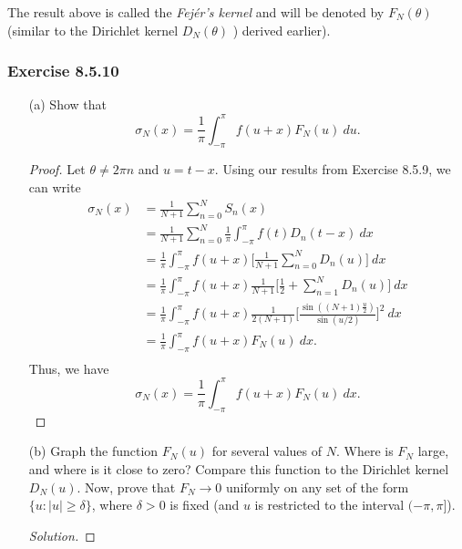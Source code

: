 The result above is called the \textit{Fej\'{e}r's kernel} and will be denoted by \( F_{N}(\theta)  \) (similar to the Dirichlet kernel \( D_{N}(\theta)  \) ) derived earlier).
\subsubsection{Exercise 8.5.10} 
\begin{enumerate}
    \item[(a)] Show that 
        \[  \sigma_{N}(x) = \frac{ 1 }{ \pi  } \int_{ -\pi  }^{ \pi  } f(u+x) F_{N}(u)   \ du. \]
        \begin{proof}
        Let \( \theta \neq 2 \pi n \) and \( u = t - x   \). Using our results from Exercise 8.5.9, we can write 
        \begin{align*}
          \sigma_{N}(x)   &= \frac{ 1 }{ N+1 } \sum_{ n=0 }^{ N } S_{n}(x) \\
                    &= \frac{ 1 }{ N+1 } \sum_{ n=0  }^{ N } \frac{ 1 }{ \pi  } \int_{ -\pi  }^{ \pi  } f(t) D_{n}(t-x) \ dx \\ 
                    &= \frac{ 1 }{ \pi  } \int_{ -\pi  }^{ \pi  } f(u+x) \Big[  \frac{ 1  }{ N+1 } \sum_{ n=0  }^{ N  } D_{n}(u) \Big]  \ dx \\
                    &= \frac{ 1 }{ \pi  } \int_{ -\pi  }^{ \pi  } f(u+x) \frac{ 1 }{ N+1 } \Big[ \frac{ 1 }{ 2 } + \sum_{ n=1 }^{ N } D_{n}(u) \Big]   \ dx \\
                    &= \frac{ 1 }{ \pi  } \int_{ -\pi  }^{ \pi  } f(u+x) \frac{ 1 }{ 2(N+1) } \Big[\frac{ \sin((N+1)\frac{ u }{ 2 } ) }{ \sin(u/2) } \Big]^{2}  \ dx \\
                    &= \frac{ 1 }{ \pi  } \int_{ -\pi  }^{ \pi  } f(u+x) F_{N}(u) \ dx. \\
        \end{align*}
        Thus, we have
        \[  \sigma_{N}(x) = \frac{ 1 }{ \pi } \int_{ -\pi  }^{ \pi  } f(u+x) F_{N}(u) \ dx. \]
        \end{proof}
    \item[(b)] Graph the function \( F_{N}(u)  \) for several values of \( N \). Where is \( F_{N} \) large, and where is it close to zero? Compare this function to the Dirichlet kernel \( D_{N}(u)  \). Now, prove that \( F_{N} \to  0  \) uniformly on any set of the form \( \{ u: | u  | \geq \delta \}  \), where \( \delta > 0  \) is fixed (and \( u  \) is restricted to the interval \( (-\pi,\pi] \)). 
        \begin{proof}[Solution]
        

\end{proof}
\end{enumerate}
